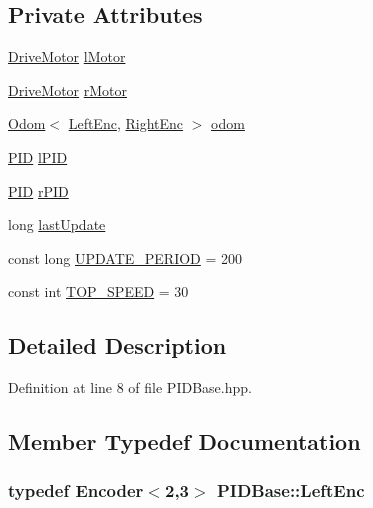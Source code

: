 \subsection*{Private Attributes}
\begin{DoxyCompactItemize}
\item 
\hyperlink{classDriveMotor}{Drive\-Motor} \hyperlink{classPIDBase_a344ca2736e618d42445d568d038be7d9}{l\-Motor}
\item 
\hyperlink{classDriveMotor}{Drive\-Motor} \hyperlink{classPIDBase_ae52cf8a147c90af4334e1ad14f48aa4a}{r\-Motor}
\item 
\hyperlink{classOdom}{Odom}$<$ \hyperlink{classPIDBase_af7a230a127fe585279e6ed264f504d51}{Left\-Enc}, \hyperlink{classPIDBase_a1b40a4e43b87a65c6d501ccf5789acc3}{Right\-Enc} $>$ \hyperlink{classPIDBase_a3adee9b84ba975616f672a7620ac16b8}{odom}
\item 
\hyperlink{classPID}{P\-I\-D} \hyperlink{classPIDBase_a7e39df880dd6279479e77febe800a6ba}{l\-P\-I\-D}
\item 
\hyperlink{classPID}{P\-I\-D} \hyperlink{classPIDBase_a940d3dae6038a472ea613c03c5be3846}{r\-P\-I\-D}
\item 
long \hyperlink{classPIDBase_a9ac4b3515239d988dae8ebc95dc09ed5}{last\-Update}
\item 
const long \hyperlink{classPIDBase_a6756b30f25632224de999cb7a4ff2315}{U\-P\-D\-A\-T\-E\-\_\-\-P\-E\-R\-I\-O\-D} = 200
\item 
const int \hyperlink{classPIDBase_a42e66aae0ea7d5a54bffc062cc3ebf2b}{T\-O\-P\-\_\-\-S\-P\-E\-E\-D} = 30
\end{DoxyCompactItemize}


\subsection{Detailed Description}


Definition at line 8 of file P\-I\-D\-Base.\-hpp.



\subsection{Member Typedef Documentation}
\hypertarget{classPIDBase_af7a230a127fe585279e6ed264f504d51}{
\subsubsection[{Left\-Enc}]{\setlength{\rightskip}{0pt plus 5cm}typedef {\bf Encoder}$<$2,3$>$ {\bf P\-I\-D\-Base\-::\-Left\-Enc}\hspace{0.3cm}{\ttfamily [private]}}}\label{classPIDBase_af7a230a127fe585279e6ed264f504d51}


